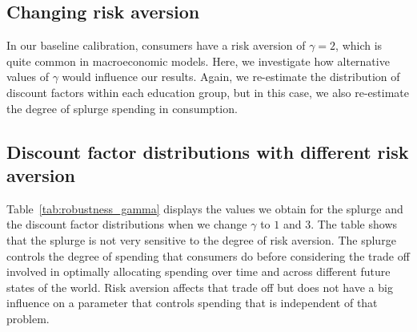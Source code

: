 \documentclass{econsocart}
\begin{document}
\FloatBarrier
\hypertarget{changing-risk-aversion}{}\par\subsection*{Changing risk aversion}
\whenintegrated{\label{sec:robust_gamma}} %

In our baseline calibration, consumers have a risk aversion of $\gamma=2$, which is quite common in macroeconomic models.
Here, we investigate how alternative values of $\gamma$ would influence our results.
Again, we re-estimate the distribution of discount factors within each education group, but in this case, we also re-estimate the degree of splurge spending in consumption.

\subsection*{Discount factor distributions with different risk aversion}
\whenintegrated{\label{sec:robust_gamma_estim}} %

Table~\ref{tab:robustness_gamma} displays the values we obtain for the splurge and the discount factor distributions when we change $\gamma$ to $1$ and $3$.
The table shows that the splurge is not very sensitive to the degree of risk aversion.
The splurge controls the degree of spending that consumers do before considering the trade off involved in optimally allocating spending over time and across different future states of the world.
Risk aversion affects that trade off but does not have a big influence on a parameter that controls spending that is independent of that problem.
\end{document}
